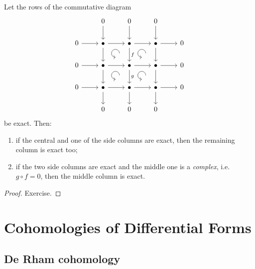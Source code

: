 \begin{lem}\label{3x3-lemma}
    Let the rows of the commutative diagram
    \[\begin{tikzcd}[every matrix/.append style={name=m},   
        execute at end picture={\draw [<-] ([xshift=-7mm,yshift=-9mm]m-2-3.north) arc[start angle=-90,delta angle=-270,radius=0.2cm];
        \draw [<-] ([xshift=-7mm,yshift=-9mm]m-2-4.north) arc[start angle=-90,delta angle=-270,radius=0.2cm];
        \draw [<-] ([xshift=-7mm,yshift=-9mm]m-3-3.north) arc[start angle=-90,delta angle=-270,radius=0.2cm];
        \draw [<-] ([xshift=-7mm,yshift=-9mm]m-3-4.north) arc[start angle=-90,delta angle=-270,radius=0.2cm];}]
        &0\arrow[d]&0\arrow[d]&0\arrow[d]&\\
        0\arrow[r]& \bullet \arrow[r]\arrow[d] & \bullet\arrow[r]\arrow[d,"f"] & \bullet \arrow[r]\arrow[d] & 0\\
        0\arrow[r]& \bullet \arrow[r]\arrow[d] & \bullet\arrow[r]\arrow[d,"g"] & \bullet \arrow[r]\arrow[d] & 0\\
       0\arrow[r]& \bullet\arrow[r]\arrow[d] & \bullet\arrow[r]\arrow[d] & \bullet\arrow[r]\arrow[d] &0\\
       &0&0&0&
    \end{tikzcd}\]
    be exact. Then:
    \begin{enumerate}
        \item if the central and one of the side columns are exact, then the remaining column is exact too;
        \item if the two side columns are exact and the middle one is a \emph{complex}, i.e.\ $g\circ f=0$, then the middle column is exact.
    \end{enumerate}
\end{lem}
\begin{proof}
    Exercise.
\end{proof}







\clearpage
\section{Cohomologies of Differential Forms \texorpdfstring{\ucmark}{}}

\subsection{De Rham cohomology}


